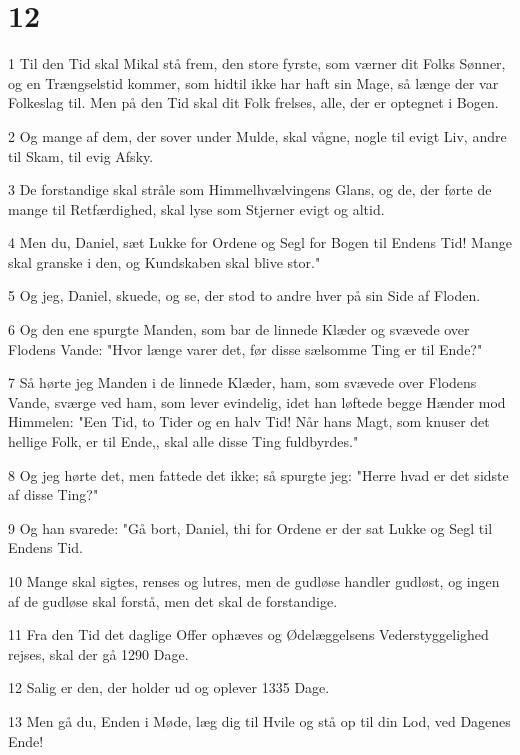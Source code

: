 \chapter{12}

\par 1 Til den Tid skal Mikal stå frem, den store fyrste, som værner dit Folks Sønner, og en Trængselstid kommer, som hidtil ikke har haft sin Mage, så længe der var Folkeslag til. Men på den Tid skal dit Folk frelses, alle, der er optegnet i Bogen.
\par 2 Og mange af dem, der sover under Mulde, skal vågne, nogle til evigt Liv, andre til Skam, til evig Afsky.
\par 3 De forstandige skal stråle som Himmelhvælvingens Glans, og de, der førte de mange til Retfærdighed, skal lyse som Stjerner evigt og altid.
\par 4 Men du, Daniel, sæt Lukke for Ordene og Segl for Bogen til Endens Tid! Mange skal granske i den, og Kundskaben skal blive stor."
\par 5 Og jeg, Daniel, skuede, og se, der stod to andre hver på sin Side af Floden.
\par 6 Og den ene spurgte Manden, som bar de linnede Klæder og svævede over Flodens Vande: "Hvor længe varer det, før disse sælsomme Ting er til Ende?"
\par 7 Så hørte jeg Manden i de linnede Klæder, ham, som svævede over Flodens Vande, sværge ved ham, som lever evindelig, idet han løftede begge Hænder mod Himmelen: "Een Tid, to Tider og en halv Tid! Når hans Magt, som knuser det hellige Folk, er til Ende,, skal alle disse Ting fuldbyrdes."
\par 8 Og jeg hørte det, men fattede det ikke; så spurgte jeg: "Herre hvad er det sidste af disse Ting?"
\par 9 Og han svarede: "Gå bort, Daniel, thi for Ordene er der sat Lukke og Segl til Endens Tid.
\par 10 Mange skal sigtes, renses og lutres, men de gudløse handler gudløst, og ingen af de gudløse skal forstå, men det skal de forstandige.
\par 11 Fra den Tid det daglige Offer ophæves og Ødelæggelsens Vederstyggelighed rejses, skal der gå 1290 Dage.
\par 12 Salig er den, der holder ud og oplever 1335 Dage.
\par 13 Men gå du, Enden i Møde, læg dig til Hvile og stå op til din Lod, ved Dagenes Ende!



